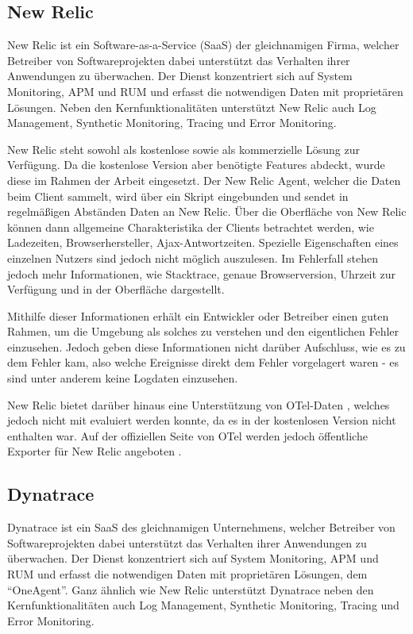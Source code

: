 \subsection{New Relic}

New Relic \cite{NewRelic} ist ein Software-as-a-Service (SaaS) der gleichnamigen Firma, welcher Betreiber von Softwareprojekten dabei unterstützt das Verhalten ihrer Anwendungen zu überwachen. Der Dienst konzentriert sich auf System Monitoring, APM und RUM und erfasst die notwendigen Daten mit proprietären Lösungen. Neben den Kernfunktionalitäten unterstützt New Relic auch Log Management, Synthetic Monitoring, Tracing und Error Monitoring.


New Relic steht sowohl als kostenlose sowie als kommerzielle Lösung zur Verfügung. Da die kostenlose Version aber benötigte Features abdeckt, wurde diese im Rahmen der Arbeit eingesetzt. Der New Relic Agent, welcher die Daten beim Client sammelt, wird über ein Skript eingebunden und sendet in regelmäßigen Abständen Daten an New Relic. Über die Oberfläche von New Relic können dann allgemeine Charakteristika der Clients betrachtet werden, wie Ladezeiten, Browserhersteller, Ajax-Antwortzeiten. Spezielle Eigenschaften eines einzelnen Nutzers sind jedoch nicht möglich auszulesen. Im Fehlerfall stehen jedoch mehr Informationen, wie Stacktrace, genaue Browserversion, Uhrzeit zur Verfügung und in der Oberfläche dargestellt.

Mithilfe dieser Informationen erhält ein Entwickler oder Betreiber einen guten Rahmen, um die Umgebung als solches zu verstehen und den eigentlichen Fehler einzusehen. Jedoch geben diese Informationen nicht darüber Aufschluss, wie es zu dem Fehler kam, also welche Ereignisse direkt dem Fehler vorgelagert waren - es sind unter anderem keine Logdaten einzusehen.

New Relic bietet darüber hinaus eine Unterstützung von OTel-Daten  \cite{NewRelicAnnoundOTelBetaSupport}, welches jedoch nicht mit evaluiert werden konnte, da es in der kostenlosen Version nicht enthalten war. Auf der offiziellen Seite von OTel werden jedoch  öffentliche Exporter für New Relic angeboten \cite{OpenTelemetryRegistry}.

\subsection{Dynatrace}

Dynatrace \cite{Dynatrace} ist ein SaaS des gleichnamigen Unternehmens, welcher Betreiber von Softwareprojekten dabei unterstützt das Verhalten ihrer Anwendungen zu überwachen. Der Dienst konzentriert sich auf System Monitoring, APM und RUM und erfasst die notwendigen Daten mit proprietären Lösungen, dem \enquote{OneAgent}. Ganz ähnlich wie New Relic unterstützt Dynatrace neben den Kernfunktionalitäten auch Log Management, Synthetic Monitoring, Tracing und Error Monitoring.


